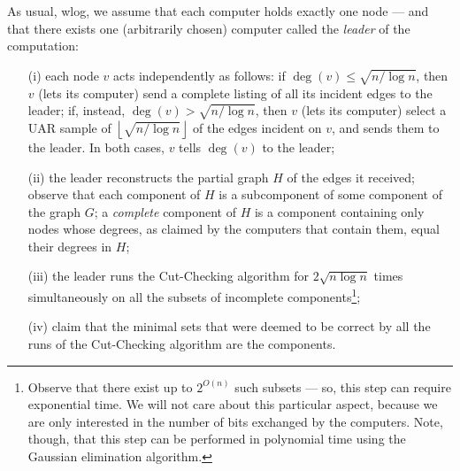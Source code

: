 As usual, wlog, we assume that each computer holds exactly one node — and that there exists one (arbitrarily chosen) computer called the {\em leader} of the computation:\begin{itemize}
\item[(i)] each node $v$ acts independently as follows: if $\deg(v) \le \sqrt{n / \log n}$, then $v$ (lets its computer) send a complete listing of  all its incident edges to the leader; if, instead, $\deg(v) > \sqrt{n / \log n}$, then $v$ (lets its computer) select a UAR sample of $\left\lfloor\sqrt{n / \log n}\right\rfloor$ of the  edges incident on $v$, and sends them to the leader. In both cases, $v$ tells $\deg(v)$ to the leader;
\item[(ii)] the leader reconstructs the partial graph $H$ of the edges it received; observe that each component of $H$ is a subcomponent of some component of the  graph $G$; a {\em complete} component of $H$ is a component containing only nodes whose degrees, as claimed by the computers that contain them, equal their degrees in $H$;
\item[(iii)]  the leader  runs the Cut-Checking algorithm for $2 \sqrt{n \log n}$ times simultaneously on all the subsets of incomplete components\footnote{Observe that there exist up to $2^{O(n)}$ such subsets --- so, this step can require exponential time. We will not care about this particular aspect, because we are only interested in the number of bits exchanged by the computers. Note, though, that this step can be performed in polynomial time using the Gaussian elimination algorithm.};
\item[(iv)] claim that the minimal sets that were deemed to be correct by all the runs of the Cut-Checking algorithm are the components.
\end{itemize}

